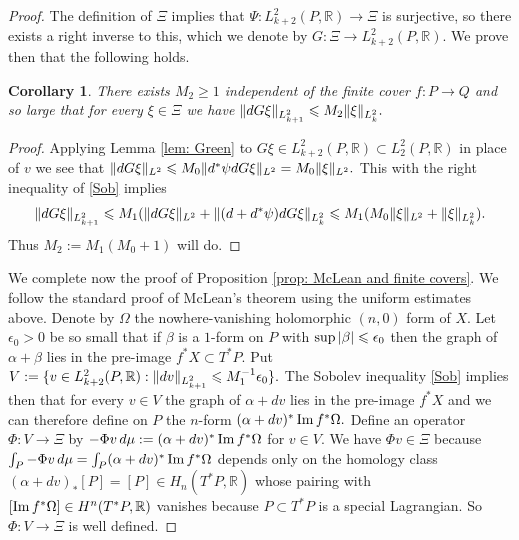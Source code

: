 \documentclass{article}
\theoremstyle{plain}%
\newtheorem{cor}[thm]{Corollary}
\theoremstyle{definition}
\numberwithin{equation}{section}
\numberwithin{figure}{section}
\def\eq{\eqref}
\def\l{\label}
\def\Im{\mathop{\rm Im}}
\def\ge{\geqslant}
\def\le{\leqslant\nobreak}
\def\R{{\mathbin{\mathbb R}}}
\def\al{\alpha}
\def\be{\beta}
\def\ep{\epsilon}
\def\Ph{\Phi}
\def\ps{\psi}
\def\Ps{\Psi}
\def\Om{\Omega}
\begin{document}
\begin{proof}
The definition of $\Xi$ implies that $\Ps :L^2_{k+2}(P,\R)\to\Xi$ is surjective, so there exists a right inverse to this, which we denote by $G:\Xi\to L^2_{k+2}(P,\R).$ We prove then that the following holds.
\begin{cor}\l{cor: Green}
There exists $M_2\ge 1$ independent of the finite cover $f:P\to Q$ and so large that for every $\xi\in\Xi$ we have $\|dG\xi\|_{L^2_{k+1}}\le M_2\|\xi\|_{L^2_k}.$
\end{cor}
\begin{proof}
Applying Lemma \ref{lem: Green} to $G\xi\in L^2_{k+2}(P,\R)\subset L^2_2(P,\R)$ in place of $v$ we see that $\|dG\xi\|_{L^2}\le M_0\|d^*\ps dG\xi\|_{L^2}=M_0\|\xi\|_{L^2}.$
This with the right inequality of \eq{Sob} implies
\[\|dG\xi\|_{L^2_{k+1}} \le M_1(\|dG\xi\|_{L^2}+ \|(d+d^*\ps)dG\xi\|_{L^2_k}
 \le M_1(M_0\|\xi\|_{L^2}+ \|\xi\|_{L^2_k}).\]
Thus $M_2:=M_1(M_0+1)$ will do.
\end{proof}

We complete now the proof of Proposition \ref{prop: McLean and finite covers}. We follow the standard proof of McLean's theorem \cite[Proposition 2.13]{J5} using the uniform estimates above. Denote by $\Om$ the nowhere-vanishing holomorphic $(n,0)$ form of $X.$ Let $\ep_0>0$ be so small that if $\be$ is a $1$-form on $P$ with $\sup|\be|\le\ep_0$ then the graph of $\al+\be$ lies in the pre-image $f^*X\subset T^*P.$ Put $V:=\{v\in L^2_{k+2}(P,\R): \|dv\|_{L^2_{k+1}}\le M_1^{-1}\ep_0\}.$ The Sobolev inequality \eq{Sob} implies then that for every $v\in V$ the graph of $\al+dv$ lies in the pre-image $f^*X$ and we can therefore define on $P$ the $n$-form $(\al+dv)^*\Im f^*\Om.$ Define an operator $\Ph:V \to \Xi$ by $-\Ph v\,d\mu:=(\al+dv)^*\Im f^*\Om$ for $v\in V.$ We have $\Ph v\in \Xi$ because $\int_P-\Ph v\, d\mu=\int_P(\al+dv)^*\Im f^*\Om$ depends only on the homology class $(\al+dv)_*[P]=[P]\in H_n(T^*P,\R)$ whose pairing with $[\Im f^*\Om]\in H^n(T^*P,\R)$ vanishes because $P\subset T^*P$ is a special Lagrangian. So $\Ph:V\to \Xi$ is well defined.   


\end{proof}
\end{document}
